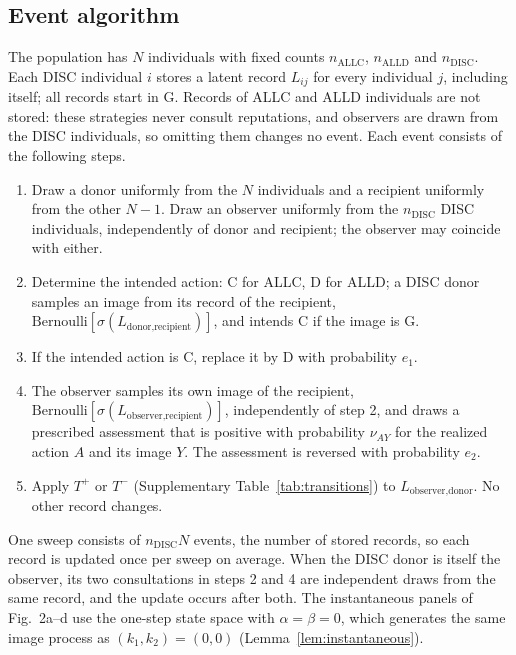 \documentclass[fleqn,10pt]{article}
\theoremstyle{plain}
\theoremstyle{remark}
\newcommand{\FigRecognition}{2}
\newcommand{\G}{\mathrm G}
\newcommand{\C}{\mathrm C}
\newcommand{\D}{\mathrm D}
\newcommand{\ALLC}{\mathrm{ALLC}}
\newcommand{\ALLD}{\mathrm{ALLD}}
\newcommand{\DISC}{\mathrm{DISC}}
\begin{document}
\subsection{Event algorithm}
The population has $N$ individuals with fixed counts $n_{\ALLC}$, $n_{\ALLD}$ and
$n_{\DISC}$. Each DISC individual $i$ stores a latent record $L_{ij}$ for every
individual $j$, including itself; all records start in $\G$. Records of ALLC and
ALLD individuals are not stored: these strategies never consult reputations, and
observers are drawn from the DISC individuals, so omitting them changes no
event. Each event consists of the following steps.
\begin{enumerate}
\item Draw a donor uniformly from the $N$ individuals and a recipient uniformly
from the other $N-1$. Draw an observer uniformly from the $n_{\DISC}$ DISC
individuals, independently of donor and recipient; the observer may coincide
with either.
\item Determine the intended action: $\C$ for ALLC, $\D$ for ALLD; a DISC donor
samples an image from its record of the recipient,
$\mathrm{Bernoulli}[\sigma(L_{\text{donor},\text{recipient}})]$, and intends $\C$
if the image is $\G$.
\item If the intended action is $\C$, replace it by $\D$ with probability $e_1$.
\item The observer samples its own image of the recipient,
$\mathrm{Bernoulli}[\sigma(L_{\text{observer},\text{recipient}})]$, independently of
step 2, and draws a prescribed assessment that is positive with probability
$\nu_{AY}$ for the realized action $A$ and its image $Y$. The assessment is
reversed with probability $e_2$.
\item Apply $T^{+}$ or $T^{-}$ (Supplementary Table~\ref{tab:transitions}) to
$L_{\text{observer},\text{donor}}$. No other record changes.
\end{enumerate}
One sweep consists of $n_{\DISC}N$ events, the number of stored records, so each
record is updated once per sweep on average. When the DISC donor is itself the
observer, its two consultations in steps 2 and 4 are independent draws from the
same record, and the update occurs after both. The instantaneous panels of
Fig.~\FigRecognition a--d use the one-step state space with $\alpha=\beta=0$,
which generates the same image process as $(k_1,k_2)=(0,0)$
(Lemma~\ref{lem:instantaneous}).
\end{document}
